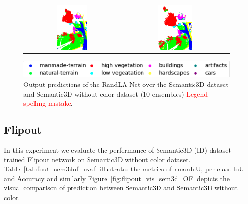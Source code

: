 \begin{figure}[h!]
\begin{tabular}{cc}
            \includegraphics[width=0.33\textwidth, height=0.18\textheight]{images/ood_imgs/de_sem3d/de_class_prob_3.pdf}&
            \includegraphics[width=0.33\textwidth, height=0.18\textheight]{images/sem3d_of/de_sem3d_of_3.pdf}\\
        \end{tabular}
        \includegraphics[scale=0.65]{images/legend.png}
        \caption{Output predictions of the RandLA-Net over the Semantic3D dataset and Semantic3D without color
         dataset  (10 ensembles) \textcolor{red}{Legend spelling mistake}.}
        \label{fig:deepensemble_vis_sem3d_OF}
    \end{figure}
    
    \FloatBarrier
    
    \subsection{Flipout}
    In this experiment we evaluate the performance of Semantic3D (ID) dataset trained Flipout network on Semantic3D without color dataset.
    Table~\ref{tab:fout_sem3dof_eval} illustrates the metrics of meanIoU, per-class IoU and Accuracy and similarly Figure~\ref{fig:flipout_vis_sem3d_OF} depicts the visual comparison of prediction between Semantic3D and Semantic3D without color.

